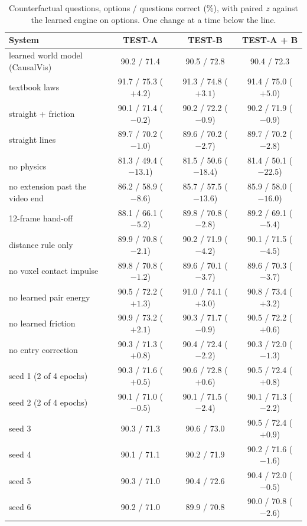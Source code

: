 \documentclass[10pt,onecolumn,letterpaper]{article}
\newcommand{\sys}{CausalVis}
\begin{document}
\begin{table}[h]
\caption{Counterfactual questions, options / questions correct (\%), with paired $z$ against the learned engine on options. One change at a time below the line.}
\label{tab:full}
\centering
\small
\begin{tabular}{@{}lccc@{}}
\toprule
System & TEST-A & TEST-B & TEST-A + B \\
\midrule
learned world model (\sys{}) & 90.2 / 71.4 & 90.5 / 72.8 & 90.4 / 72.3 \\
textbook laws & 91.7 / 75.3 ($+4.2$) & 91.3 / 74.8 ($+3.1$) & 91.4 / 75.0 ($+5.0$) \\
straight + friction & 90.1 / 71.4 ($-0.2$) & 90.2 / 72.2 ($-0.9$) & 90.2 / 71.9 ($-0.9$) \\
straight lines & 89.7 / 70.2 ($-1.0$) & 89.6 / 70.2 ($-2.7$) & 89.7 / 70.2 ($-2.8$) \\
no physics & 81.3 / 49.4 ($-13.1$) & 81.5 / 50.6 ($-18.4$) & 81.4 / 50.1 ($-22.5$) \\
\midrule
no extension past the video end & 86.2 / 58.9 ($-8.6$) & 85.7 / 57.5 ($-13.6$) & 85.9 / 58.0 ($-16.0$) \\
12-frame hand-off & 88.1 / 66.1 ($-5.2$) & 89.8 / 70.8 ($-2.8$) & 89.2 / 69.1 ($-5.4$) \\
distance rule only & 89.9 / 70.8 ($-2.1$) & 90.2 / 71.9 ($-4.2$) & 90.1 / 71.5 ($-4.5$) \\
no voxel contact impulse & 89.8 / 70.8 ($-1.2$) & 89.6 / 70.1 ($-3.7$) & 89.6 / 70.3 ($-3.7$) \\
no learned pair energy & 90.5 / 72.2 ($+1.3$) & 91.0 / 74.1 ($+3.0$) & 90.8 / 73.4 ($+3.2$) \\
no learned friction & 90.9 / 73.2 ($+2.1$) & 90.3 / 71.7 ($-0.9$) & 90.5 / 72.2 ($+0.6$) \\
no entry correction & 90.3 / 71.3 ($+0.8$) & 90.4 / 72.4 ($-2.2$) & 90.3 / 72.0 ($-1.3$) \\
\midrule
seed 1 (2 of 4 epochs) & 90.3 / 71.6 ($+0.5$) & 90.6 / 72.8 ($+0.6$) & 90.5 / 72.4 ($+0.8$) \\
seed 2 (2 of 4 epochs) & 90.1 / 71.0 ($-0.5$) & 90.1 / 71.5 ($-2.4$) & 90.1 / 71.3 ($-2.2$) \\
seed 3 & 90.3 / 71.3 & 90.6 / 73.0 & 90.5 / 72.4 ($+0.9$) \\
seed 4 & 90.1 / 71.1 & 90.2 / 71.9 & 90.2 / 71.6 ($-1.6$) \\
seed 5 & 90.3 / 71.0 & 90.4 / 72.6 & 90.4 / 72.0 ($-0.5$) \\
seed 6 & 90.2 / 71.0 & 89.9 / 70.8 & 90.0 / 70.8 ($-2.6$) \\
\bottomrule
\end{tabular}
\end{table}
\end{document}
